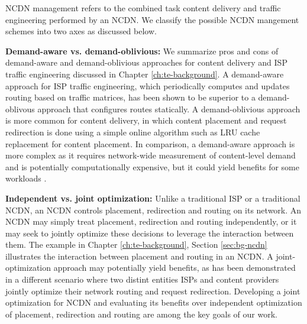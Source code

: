 NCDN management refers to the combined task content delivery and traffic engineering performed by an NCDN. We classify the possible NCDN mangement schemes into two axes as discussed below. 

\textbf{Demand-aware vs. demand-oblivious:} We summarize pros and cons of demand-aware and demand-oblivious approaches for content delivery and ISP traffic engineering discussed in Chapter \ref{ch:te-background}. A demand-aware approach for ISP traffic engineering, which periodically computes and updates routing based on traffic matrices, has been shown to be superior to a demand-oblivous approach that configures routes statically. A demand-oblivious approach is more common for content delivery, in which content placement and request redirection is done using a simple online algorithm such as LRU cache replacement for content placement. In comparison, a demand-aware approach is more complex as it requires network-wide measurement of content-level demand and is potentially computationally expensive, but it could yield benefits for some workloads \cite{Applegate2010}.

\textbf{Independent vs. joint optimization:} Unlike a traditional ISP or a traditional NCDN, an NCDN controls placement, redirection and routing on its network. An NCDN may simply treat placement, redirection and routing independently, or it may seek to jointly optimize these decisions to leverage the interaction between them. 
The example in Chapter \ref{ch:te-background}, Section \ref{sec:bg-ncdn} illustrates the interaction between placement and routing in an NCDN. A joint-optimization approach may potentially yield benefits, as has been demonstrated in a different scenario where two distint entities ISPs and content providers jointly optimize their network routing and request redirection. Developing a joint optimization for NCDN and evaluating its benefits over independent optimization of placement, redirection and routing are among the key goals of our work.


